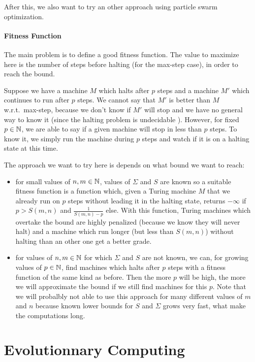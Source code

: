 \documentclass{report}
\begin{document}
After this, we also want to try an other approach using particle swarm optimization.

\paragraph{Fitness Function}
The main problem is to define a good fitness function. The value to maximize here is the number of steps before halting (for the max-step case), in order to reach the bound.

Suppose we have a machine $M$ which halts after $p$ steps and a machine $M'$ which continues to run after $p$ steps.
We cannot say that $M'$ is better than $M$ w.r.t.\ max-step, because we don't know if $M'$ will stop and we have no general way to know it (since the halting problem is undecidable \cite{turing}).
However, for fixed $p \in \mathbb{N}$, we are able to say if a given machine will stop in less than $p$ steps. To know it, we simply run the machine during $p$ steps and watch if it is on a halting state at this time.

The approach we want to try here is depends on what bound we want to reach:
\begin{itemize}
\item for small values of $n,m \in \mathbb{N}$, values of $\Sigma$ and $S$ are known \cite{rado} so a suitable fitness function is a function which, given a Turing machine $M$ that we already run on $p$ steps without leading it in the halting state, returns $- \infty$ if $p > S(m,n)$ and $\frac{1}{S(m,n) - p}$ else. With this function, Turing machines which overtake the bound are highly penalized (because we know they will never halt) and a machine which run longer (but less than $S(m,n)$) without halting than an other one get a better grade.

\item for values of $n, m \in \mathbb{N}$ for which $\Sigma$ and $S$ are not known, we can, for growing values of $p \in \mathbb{N}$, find machines which halts after $p$ steps with a fitness function of the same kind as before. Then the more $p$ will be high, the more we will approximate the bound if we still find machines for this $p$. Note that we will probalbly not able to use this approach for many different values of $m$ and $n$ because known lower bounds for $S$ and $\Sigma$ grows very fast, what make the computations long.
\end{itemize}

\section{Evolutionnary Computing}
\label{chap:ec}
\end{document}
